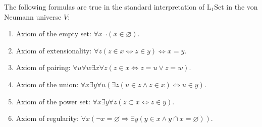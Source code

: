 The following formulas are true in the standard interpretation of $\mathrm{L}_1\mathrm{Set}$ in the von Neumann universe $V$:
\begin{enumerate}
\item[(a)] Axiom of the empty set: $\forall x \neg (x \in \varnothing)$.
\item[(b)] Axiom of extensionality: $\forall z (z \in x \iff z \in y) \iff x = y$.
\item[(c)] Axiom of pairing: $\forall u \forall w \exists x \forall z (z \in x \iff z = u \vee z = w)$.
\item[(d)] Axiom of the union: $\forall x \exists y \forall u (\exists z (u \in z \land z \in x) \iff u \in y)$.
\item[(e)] Axiom of the power set: $\forall x \exists y \forall z (z \subset x \iff z \in y)$.
\item[(f)] Axiom of regularity: $\forall x (\neg x = \varnothing \Rightarrow \exists y (y \in x \land y \cap x = \varnothing))$.
\end{enumerate}

